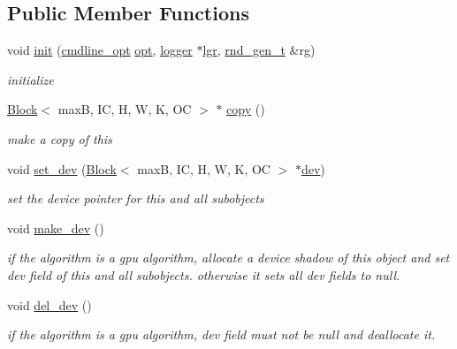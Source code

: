 \subsection*{Public Member Functions}
\begin{DoxyCompactItemize}
\item 
void \hyperlink{structBlock_a53eb5f86be4540cf491024b2b2783b42}{init} (\hyperlink{structcmdline__opt}{cmdline\+\_\+opt} \hyperlink{structBlock_ad91e112b767ccd7035a37873cbc121a9}{opt}, \hyperlink{structlogger}{logger} $\ast$\hyperlink{structBlock_a8e037036c2020d2ac98fc0792d3f84f4}{lgr}, \hyperlink{structrnd__gen__t}{rnd\+\_\+gen\+\_\+t} \&rg)
\begin{DoxyCompactList}\small\item\em initialize \end{DoxyCompactList}\item 
\hyperlink{structBlock}{Block}$<$ maxB, IC, H, W, K, OC $>$ $\ast$ \hyperlink{structBlock_a10734345f8456513bbd7c792b51656af}{copy} ()
\begin{DoxyCompactList}\small\item\em make a copy of this \end{DoxyCompactList}\item 
void \hyperlink{structBlock_a11093fd68976a6a40155cfb42397653c}{set\+\_\+dev} (\hyperlink{structBlock}{Block}$<$ maxB, IC, H, W, K, OC $>$ $\ast$\hyperlink{structBlock_a66767aae2045de05ce1dc09a92d164c4}{dev})
\begin{DoxyCompactList}\small\item\em set the device pointer for this and all subobjects \end{DoxyCompactList}\item 
void \hyperlink{structBlock_a971798b11f5cdc883880c0be2f143908}{make\+\_\+dev} ()
\begin{DoxyCompactList}\small\item\em if the algorithm is a gpu algorithm, allocate a device shadow of this object and set dev field of this and all subobjects. otherwise it sets all dev fields to null. \end{DoxyCompactList}\item 
void \hyperlink{structBlock_a46e9e4f4dcffddc409fa2b20263ea3b9}{del\+\_\+dev} ()
\begin{DoxyCompactList}\small\item\em if the algorithm is a gpu algorithm, dev field must not be null and deallocate it. \end{DoxyCompactList}\item 

\end{DoxyCompactItemize}
